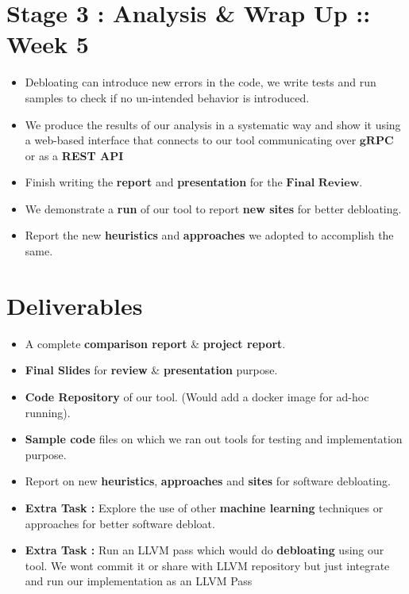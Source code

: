 \documentclass{article} %
\begin{document}
\section*{Stage 3 : Analysis \& Wrap Up :: Week 5}
\begin{itemize}
	\item Debloating can introduce new errors in the code, we write tests and run samples to check if no un-intended behavior is introduced.  
    \item We produce the results of our analysis in a systematic way and show it using a web-based interface that connects to our tool communicating over $\textbf{gRPC}$ or as a \textbf{REST API}
    \item Finish writing the \textbf{report} and \textbf{presentation} for the $\textbf{Final Review}$. 
    \item We demonstrate a \textbf{run} of our tool to report \textbf{new sites} for better debloating. 
    \item Report the new \textbf{heuristics} and \textbf{approaches} we adopted to accomplish the same. 
\end{itemize}

\section*{Deliverables} 
    \begin{itemize}
        \item A complete \textbf{comparison report} \& \textbf{project report}.
        \item \textbf{Final Slides} for \textbf{review} \& \textbf{presentation} purpose.
        \item \textbf{Code Repository} of our tool. (Would add a docker image for ad-hoc running).
        \item \textbf{Sample code} files on which we ran out tools for testing and implementation purpose.  
        \item Report on new \textbf{heuristics}, \textbf{approaches} and \textbf{sites} for software debloating.  
        \item \textbf{Extra Task :} Explore the use of other \textbf{machine learning} techniques or approaches for better software debloat.
        \item \textbf{Extra Task :} Run an LLVM pass which would do \textbf{debloating} using our tool. \color{blue} We wont commit it or share with LLVM repository but just integrate and run our implementation as an LLVM Pass \color{black}  
    \end{itemize}
\end{document}
